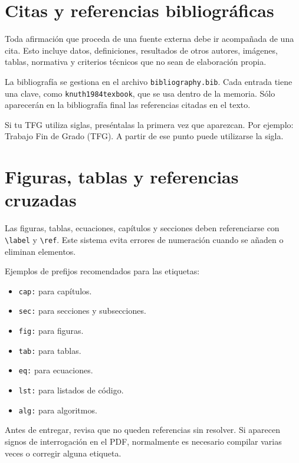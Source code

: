 \section{Citas y referencias bibliográficas}
\label{sec:citas-referencias}

Toda afirmación que proceda de una fuente externa debe ir acompañada de una
cita. Esto incluye datos, definiciones, resultados de otros autores, imágenes,
tablas, normativa y criterios técnicos que no sean de elaboración propia.

La bibliografía se gestiona en el archivo \texttt{bibliography.bib}. Cada
entrada tiene una clave, como \texttt{knuth1984texbook}, que se usa dentro de
la memoria. Sólo aparecerán en la bibliografía final las referencias citadas en
el texto.

Si tu TFG utiliza siglas, preséntalas la primera vez que aparezcan. Por ejemplo:
Trabajo Fin de Grado (TFG). A partir de ese punto puede utilizarse la sigla.

\section{Figuras, tablas y referencias cruzadas}
\label{sec:referencias-cruzadas}

Las figuras, tablas, ecuaciones, capítulos y secciones deben referenciarse con
\texttt{\textbackslash label} y \texttt{\textbackslash ref}. Este sistema evita
errores de numeración cuando se añaden o eliminan elementos.

Ejemplos de prefijos recomendados para las etiquetas:

\begin{itemize}
    \item \texttt{cap:} para capítulos.
    \item \texttt{sec:} para secciones y subsecciones.
    \item \texttt{fig:} para figuras.
    \item \texttt{tab:} para tablas.
    \item \texttt{eq:} para ecuaciones.
    \item \texttt{lst:} para listados de código.
    \item \texttt{alg:} para algoritmos.
\end{itemize}

Antes de entregar, revisa que no queden referencias sin resolver. Si aparecen
signos de interrogación en el PDF, normalmente es necesario compilar varias
veces o corregir alguna etiqueta.

